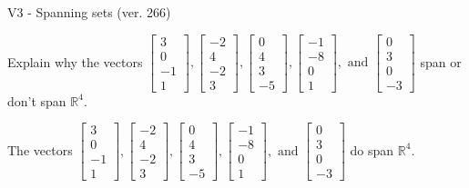 \begin{exercise}
  \begin{exerciseTitle}V3 - Spanning sets (ver. 266)\end{exerciseTitle}
  \begin{exerciseStatement}
    Explain why the vectors \(\left[\begin{array}{r}
3 \\
0 \\
-1 \\
1
\end{array}\right] , \left[\begin{array}{r}
-2 \\
4 \\
-2 \\
3
\end{array}\right] , \left[\begin{array}{r}
0 \\
4 \\
3 \\
-5
\end{array}\right] , \left[\begin{array}{r}
-1 \\
-8 \\
0 \\
1
\end{array}\right] , \text{ and } \left[\begin{array}{r}
0 \\
3 \\
0 \\
-3
\end{array}\right]\) span or don't span \(\mathbb{R}^4\). 
	


  \end{exerciseStatement}
  \begin{exerciseAnswer}
   The vectors \(\left[\begin{array}{r}
3 \\
0 \\
-1 \\
1
\end{array}\right] , \left[\begin{array}{r}
-2 \\
4 \\
-2 \\
3
\end{array}\right] , \left[\begin{array}{r}
0 \\
4 \\
3 \\
-5
\end{array}\right] , \left[\begin{array}{r}
-1 \\
-8 \\
0 \\
1
\end{array}\right] , \text{ and } \left[\begin{array}{r}
0 \\
3 \\
0 \\
-3
\end{array}\right]\) 
  	 do  
	span \(\mathbb{R}^4\).
  


  \end{exerciseAnswer}
\end{exercise}